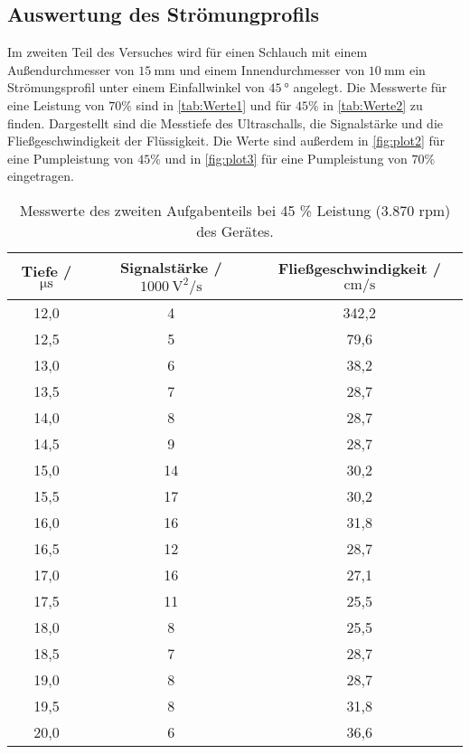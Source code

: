 \subsection{Auswertung des Strömungprofils}
\label{subsec:StroemiProf}
Im zweiten Teil des Versuches wird für einen Schlauch mit einem Außendurchmesser von $\SI{15}{\milli\meter}$ und einem Innendurchmesser von $\SI{10}{\milli\metre}$ ein
Strömungsprofil unter einem Einfallwinkel von $\SI{45}{\degree}$ angelegt. Die Messwerte für eine Leistung von $70\%$ sind in \autoref{tab:Werte1} und für $45\%$ in 
\autoref{tab:Werte2} zu finden. Dargestellt sind die Messtiefe des Ultraschalls, die Signalstärke und die Fließgeschwindigkeit der Flüssigkeit.
Die Werte sind außerdem in \autoref{fig:plot2} für eine Pumpleistung von $45 \%$ und in \autoref{fig:plot3} für eine Pumpleistung von $70 \%$ eingetragen.
\begin{table}[H]
  \centering
  \caption{Messwerte des zweiten Aufgabenteils bei 45 \% Leistung (3.870 rpm) des Gerätes.}
  \label{tab:Werte2}
  \begin{tabular}{c c c}
    \toprule
    Tiefe / $\si{\micro\second}$ & Signalstärke / $\SI{1000}{\square\volt\per\second}$ & Fließgeschwindigkeit / $\si{\centi\meter\per\second}$ \\
    \midrule
    12,0 & 4 & 342,2 \\
    12,5 & 5 & 79,6 \\
    13,0 & 6 & 38,2 \\
    13,5 & 7 & 28,7 \\
    14,0 & 8 & 28,7 \\
    14,5 & 9 & 28,7 \\
    15,0 & 14 & 30,2 \\
    15,5 & 17 & 30,2 \\
    16,0 & 16 & 31,8 \\
    16,5 & 12 & 28,7 \\
    17,0 & 16 & 27,1 \\
    17,5 & 11 & 25,5 \\
    18,0 & 8 & 25,5 \\
    18,5 & 7 & 28,7 \\
    19,0 & 8 & 28,7 \\
    19,5 & 8 & 31,8 \\
    20,0 & 6 & 36,6 \\
    \bottomrule
  \end{tabular}
\end{table}


